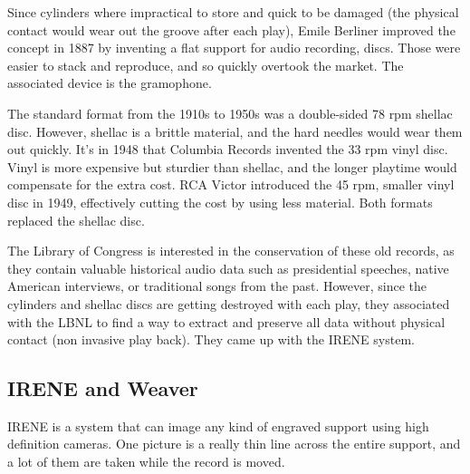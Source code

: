 \documentclass[12pt, twoside]{article}
\begin{document}
Since cylinders where impractical to store and quick to be damaged (the physical contact would wear out the groove after each play), Emile Berliner improved the concept in 1887 by inventing a flat support for audio recording, discs. Those were easier to stack and reproduce, and so quickly overtook the market. The associated device is the gramophone.

The standard format from the 1910s to 1950s was a double-sided 78 rpm shellac disc. However, shellac is a brittle material, and the hard needles would wear them out quickly. It's in 1948 that Columbia Records invented the 33 rpm vinyl disc. Vinyl is more expensive but sturdier than shellac, and the longer playtime would compensate for the extra cost. RCA Victor introduced the 45 rpm, smaller vinyl disc in 1949, effectively cutting the cost by using less material. Both formats replaced the shellac disc.

The Library of Congress is interested in the conservation of these old records, as they contain valuable historical audio data such as presidential speeches, native American interviews, or traditional songs from the past. However, since the cylinders and shellac discs are getting destroyed with each play, they associated with the LBNL to find a way to extract and preserve all data without physical contact (non invasive play back). They came up with the IRENE system.
\subsection{IRENE and Weaver}
IRENE is a system that can image any kind of engraved support using high definition cameras. One picture is a really thin line across the entire support, and a lot of them are taken while the record is moved.
\end{document}
